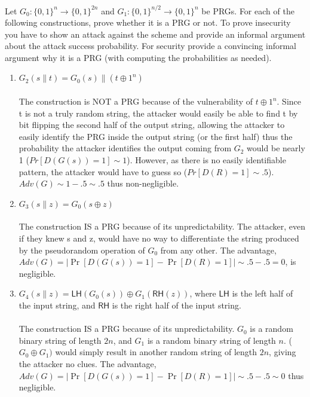 \documentclass[12pt]{article}
\newcommand{\zo}{\{0,1\}}
\newcommand*\concat{\mathbin{\|}}
\newcommand\xor{\oplus}
\begin{document}
Let $G_0:\zo^n \to \zo^{2n}$ and $G_1:\zo^{n/2} \to \zo^{n}$ be PRGs. For each of the following constructions, prove whether it is a PRG or not. To prove insecurity you have to show an attack against the scheme and provide an informal argument about the attack success probability. For security provide a convincing informal argument why it is a PRG (with computing the probabilities as needed).
\begin{enumerate}
\item $G_2(s \concat t)= G_0(s) \concat (t \xor 1^n)$ 
\\\\The construction is NOT a PRG because of the vulnerability of \(t \oplus 1^n\).
Since t is not a truly random string, the attacker would easily be able to find t by
bit flipping the second half of the output string, allowing the attacker to easily
identify the PRG inside the output string (or the first half) thus the probability the attacker
identifies the output coming from \(G_2\) would be nearly 1 (\(Pr[D(G(s)) = 1]\sim 1\)). However, as there is no easily 
identifiable pattern, the attacker would have to guess so (\(Pr[D(R) = 1] \sim .5\)). \({Adv}(G) \sim 1 -.5 \sim .5\) thus non-negligible.

\item $G_3(s \concat z)= G_0(s \oplus z)$
\\\\The construction IS a PRG because of its unpredictability. The attacker, even if they knew s and z, 
would have no way to differentiate the string produced by the pseudorandom operation of \(G_0\) from any other. 
The advantage, \({Adv}(G) = \left| \Pr[D(G(s)) = 1] - \Pr[D(R) = 1] \right| \sim .5-.5 = 0\), is negligible.

\item $G_4(s \concat z) =  \mathsf{LH}(G_0(s)) \oplus G_1(\mathsf{RH}(z))$, where $\mathsf{LH}$ is the left half of the input string, and $\mathsf{RH}$ is the right half of the input string.
\\\\The construction IS a PRG because of its unpredictability. \(G_0\) is a random binary string of length \(2n\), 
and \(G_1\) is a random binary string of length \(n\). (\(G_0 \oplus G_1)\) would simply result in another random 
string of length \(2n\), giving the attacker no clues.  The advantage, \({Adv}(G) = \left| \Pr[D(G(s)) = 1] - \Pr[D(R) = 1] 
\right| \sim .5-.5 \sim 0\) thus negligible.


\end{enumerate}
\end{document}
